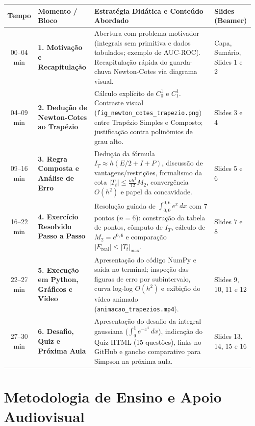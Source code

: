 \documentclass[11pt,a4paper]{article}
\begin{document}
\begin{center}
\renewcommand{\arraystretch}{1.25}
\small
\begin{tabularx}{\textwidth}{|c|p{3.4cm}|X|p{2.3cm}|}
\hline
\textbf{Tempo} & \textbf{Momento / Bloco} & \textbf{Estratégia Didática e Conteúdo Abordado} & \textbf{Slides (Beamer)} \\
\hline
00--04 min & \textbf{1. Motivação e Recapitulação} & Abertura com problema motivador (integrais sem primitiva e dados tabulados; exemplo de AUC-ROC). Recapitulação rápida do guarda-chuva Newton-Cotes via diagrama visual. & Capa, Sumário, Slides 1 e 2 \\
\hline
04--09 min & \textbf{2. Dedução de Newton-Cotes ao Trapézio} & Cálculo explícito de $C_0^1$ e $C_1^1$. Contraste visual (\texttt{fig\_newton\_cotes\_trapezio.png}) entre Trapézio Simples e Composto; justificação contra polinômios de grau alto. & Slides 3 e 4 \\
\hline
09--16 min & \textbf{3. Regra Composta e Análise de Erro} & Dedução da fórmula $I_T \approx h(E/2 + I + P)$, discussão de vantagens/restrições, formalismo da cota $|T_t| \le \frac{nh^3}{12}M_2$, convergência $O(h^2)$ e papel da concavidade. & Slides 5 e 6 \\
\hline
16--22 min & \textbf{4. Exercício Resolvido Passo a Passo} & Resolução guiada de $\int_{0,0}^{0,6} e^x\,dx$ com 7 pontos ($n=6$): construção da tabela de pontos, cômputo de $I_T$, cálculo de $M_2 = e^{0,6}$ e comparação $|E_{\text{real}}| \le |T_t|_{\max}$. & Slides 7 e 8 \\
\hline
22--27 min & \textbf{5. Execução em Python, Gráficos e Vídeo} & Apresentação do código NumPy e saída no terminal; inspeção das figuras de erro por subintervalo, curva log-log $O(h^2)$ e exibição do vídeo animado (\texttt{animacao\_trapezios.mp4}). & Slides 9, 10, 11 e 12 \\
\hline
27--30 min & \textbf{6. Desafio, Quiz e Próxima Aula} & Apresentação do desafio da integral gaussiana ($\int_0^1 e^{-x^2}\,dx$), indicação do Quiz HTML (15 questões), links no GitHub e gancho comparativo para Simpson na próxima aula. & Slides 13, 14, 15 e 16 \\
\hline
\end{tabularx}
\end{center}

\section{Metodologia de Ensino e Apoio Audiovisual}
\end{document}
